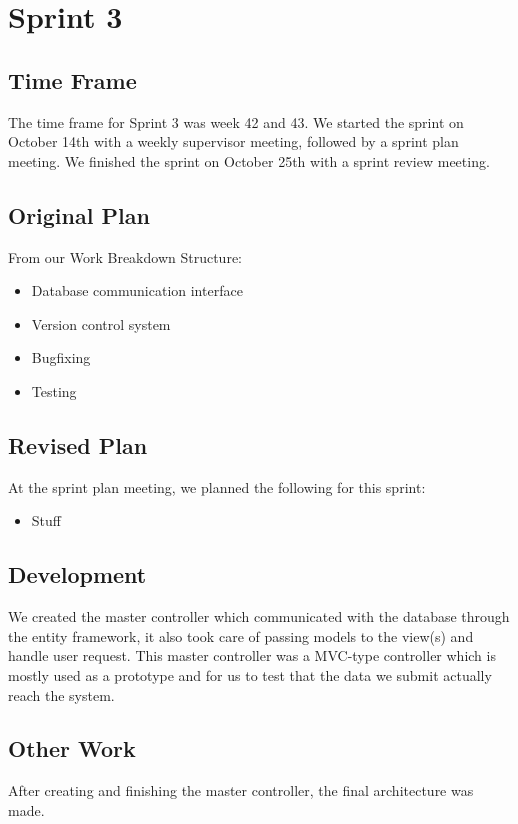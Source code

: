 \section{Sprint 3}

\subsection{Time Frame}
The time frame for Sprint 3 was week 42 and 43. We started the sprint on October 14th with a weekly supervisor meeting, followed by a sprint plan meeting. We finished the sprint on October 25th with a sprint review meeting.

\subsection{Original Plan}
From our Work Breakdown Structure:
\begin{itemize}
	\item Database communication interface
	\item Version control system
	\item Bugfixing
	\item Testing
\end{itemize}

\subsection{Revised Plan}
At the sprint plan meeting, we planned the following for this sprint:
\begin{itemize}
	\item Stuff
\end{itemize}

\subsection{Development}
We created the master controller which communicated with the database through the entity framework, it also took care of passing models to the view(s) and handle user request. This master controller was a MVC-type controller which is mostly used as a prototype and for us to test that the data we submit actually reach the system.

\subsection{Other Work}
After creating and finishing the master controller, the final architecture was made.

